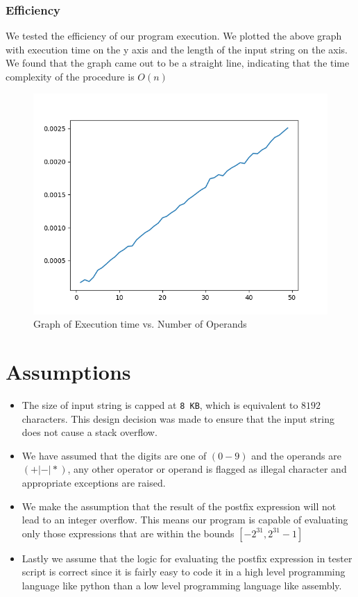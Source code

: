\documentclass[hidelinks,12pt]{article}
\begin{document}
\subsubsection{Efficiency}
We tested the efficiency of our program execution. We plotted the above graph with execution time on the y axis and the length of the input string on the axis.
We found that the graph came out to be a straight line, indicating that the time complexity of the procedure is $O(n)$


\begin{figure}[h!]
    \includegraphics[width=\linewidth]{timing.png}
    \caption{Graph of Execution time vs. Number of Operands}
    \label{fig:Testing}
\end{figure}

\section{Assumptions}
\begin{itemize}
    \item The size of input string is capped at \verb|8 KB|, which is equivalent to $8192$ characters. This design decision was made to ensure that the input string does not cause a stack overflow.
    \item We have assumed that the digits are one of $(0-9)$ and the operands are $(+|-|*)$, any other operator or operand is flagged as illegal character and appropriate exceptions are raised.
    \item We make the assumption that the result of the postfix expression will not lead to an integer overflow. This means our program is capable of evaluating only those expressions that are within the bounds $[-2^{31}, 2^{31}-1]$
    \item Lastly we assume that the logic for evaluating the postfix expression in tester script is correct since it is fairly easy to code it in a high level programming language like python than a low level programming language like assembly.
\end{itemize}
\end{document}
